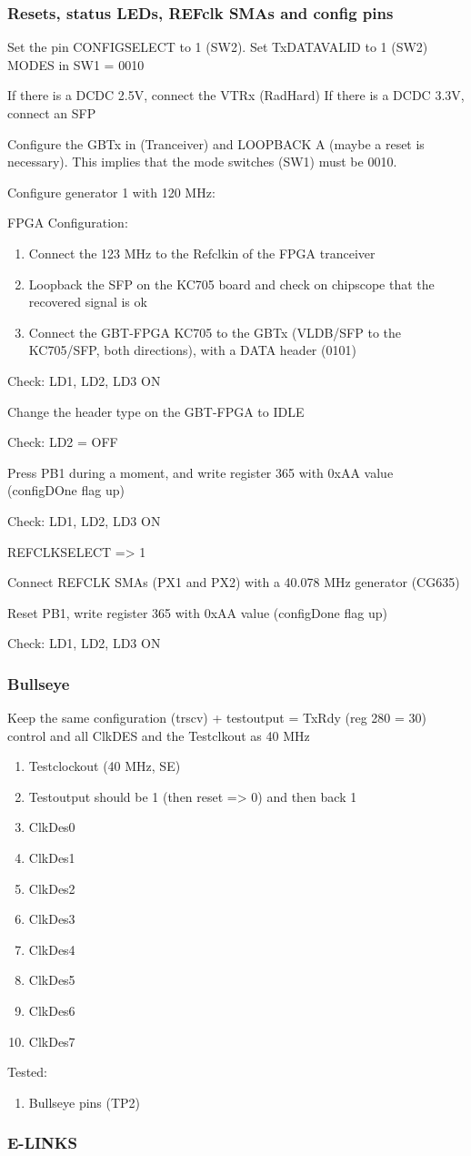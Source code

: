 \subsubsection{Resets, status LEDs, REFclk SMAs and config pins}

Set the pin CONFIGSELECT to 1 (SW2). Set TxDATAVALID to 1 (SW2)
MODES in SW1 = 0010

If there is a DCDC 2.5V, connect the VTRx (RadHard)
If there is a DCDC 3.3V, connect an SFP

Configure the GBTx in (Tranceiver) and LOOPBACK A (maybe a reset is necessary). This implies that the mode switches (SW1) must be 0010.

Configure generator 1 with 120 MHz:

FPGA Configuration:
\begin{enumerate}
    \item Connect the 123 MHz to the Refclkin of the FPGA tranceiver
    \item Loopback the SFP on the KC705 board and check on chipscope that the recovered signal is ok
    \item Connect the GBT-FPGA KC705 to the GBTx (VLDB/SFP to the KC705/SFP, both directions), with a DATA header (0101)
\end{enumerate}

Check: LD1, LD2, LD3 ON

Change the header type on the GBT-FPGA to IDLE

Check: LD2 = OFF

Press PB1 during a moment, and write register 365 with 0xAA value (configDOne flag up)

Check: LD1, LD2, LD3 ON

REFCLKSELECT => 1

Connect REFCLK SMAs (PX1 and PX2) with a 40.078 MHz generator (CG635)

Reset PB1, write register 365 with 0xAA value (configDone flag up)

Check: LD1, LD2, LD3 ON

\subsubsection{Bullseye}
Keep the same configuration (trscv) + testoutput = TxRdy (reg 280 = 30) control and all ClkDES and the Testclkout as 40 MHz

\begin{enumerate}
    \item Testclockout (40 MHz, SE)
    \item Testoutput should be 1 (then reset => 0) and then back 1
    \item ClkDes0
    \item ClkDes1
    \item ClkDes2
    \item ClkDes3
    \item ClkDes4
    \item ClkDes5
    \item ClkDes6
    \item ClkDes7
\end{enumerate}

Tested:
\begin{enumerate}
    \item Bullseye pins (TP2)
\end{enumerate}

\subsubsection{E-LINKS}
